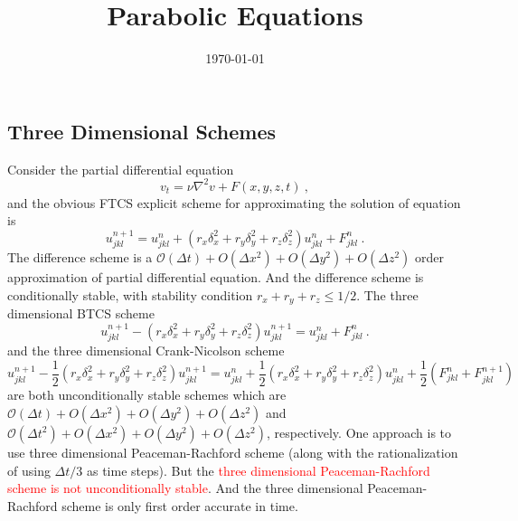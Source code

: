 \documentclass[12pt,a4paper]{article}
\title{Parabolic Equations}
\author{}
\date{\today}
\begin{document}
\maketitle










\subsection{Three Dimensional Schemes}
Consider the partial differential equation
\begin{equation}
v_t = \nu \nabla^2 v +F(x,y,z,t) ~,
\end{equation}
and the obvious FTCS explicit scheme for approximating the solution of equation is
\begin{equation}
u_{jkl}^{n+1} = u_{jkl}^{n} +(r_x \delta_x^2 +r_y \delta_y^2 +r_z \delta_z^2) u_{jkl}^{n} +F_{jkl}^{n} ~.
\end{equation}
The difference scheme is a $\mathcal O(\Delta t) + O(\Delta x^2) + O(\Delta y^2) + O(\Delta z^2)$ order approximation of partial differential equation. And the difference scheme is conditionally stable, with stability condition $r_x+r_y+r_z \leqslant 1/2$. The three dimensional BTCS scheme
\begin{equation}
u_{jkl}^{n+1} -(r_x \delta_x^2 +r_y \delta_y^2 +r_z \delta_z^2) u_{jkl}^{n+1} = u_{jkl}^{n} +F_{jkl}^{n} ~.
\end{equation}
and the three dimensional Crank-Nicolson scheme
\begin{equation}
u_{jkl}^{n+1} -\dfrac{1}{2} (r_x \delta_x^2 +r_y \delta_y^2 +r_z \delta_z^2) u_{jkl}^{n+1} = u_{jkl}^{n} +\dfrac{1}{2} (r_x \delta_x^2 +r_y \delta_y^2 +r_z \delta_z^2) u_{jkl}^{n} +\dfrac{1}{2} \left( F_{jkl}^{n} +F_{jkl}^{n+1} \right)
\end{equation}
are both unconditionally stable schemes which are $\mathcal O(\Delta t) + O(\Delta x^2) + O(\Delta y^2) + O(\Delta z^2)$ and $\mathcal O(\Delta t^2) + O(\Delta x^2) + O(\Delta y^2) + O(\Delta z^2)$, respectively. One approach is to use three dimensional Peaceman-Rachford scheme (along with the rationalization of using $\Delta t/3$ as time steps). But the \textcolor{red}{three dimensional Peaceman-Rachford scheme is not unconditionally stable}. And the three dimensional Peaceman-Rachford scheme is
only first order accurate in time. 
\end{document}
